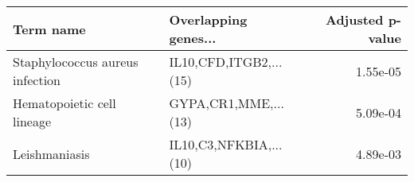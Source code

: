 \begin{tabular}{llr}
\toprule
                      Term name &   Overlapping genes... &  Adjusted p-value \\
\midrule
Staphylococcus aureus infection & IL10,CFD,ITGB2,...(15) &          1.55e-05 \\
     Hematopoietic cell lineage &   GYPA,CR1,MME,...(13) &          5.09e-04 \\
                  Leishmaniasis & IL10,C3,NFKBIA,...(10) &          4.89e-03 \\
\bottomrule
\end{tabular}
